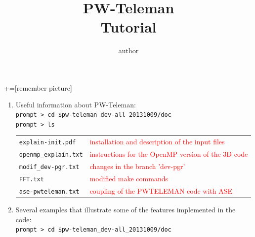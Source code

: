 \documentclass[10pt]{beamer}
\title%
{PW-Teleman\\
Tutorial }
\author[shortname]{author
 }
\institute[shortinst]{institute}
\begin{document}
+=[remember picture]

\begin{frame}
\titlepage{}
\end{frame}

\begin{frame}
\begin{enumerate}
\item Useful information about PW-Teleman:\\
\vspace*{0.2cm}
{\tt prompt > cd \$pw-teleman\_dev-all\_20131009/doc}\\
\vspace*{0.2cm}
{\tt prompt > ls}\\
\vspace*{0.4cm}

\begin{tabular}{ll}
\vspace*{0.2cm}
{\tt explain-init.pdf}& \footnotesize{\textcolor{red}{installation and description of the input files}}\\
\vspace*{0.2cm}
{\tt openmp\_explain.txt} & \footnotesize{\textcolor{red}{instructions for the OpenMP version of the 3D code}}\\
\vspace*{0.2cm}
{\tt modif\_dev-pgr.txt} &\footnotesize{\textcolor{red}{changes in the branch 'dev-pgr'}}\\
\vspace*{0.2cm}
{\tt FFT.txt} & \footnotesize{\textcolor{red}{modified make commands}}\\
\vspace*{0.2cm}
{\tt ase-pwteleman.txt} & \footnotesize{\textcolor{red}{coupling of the PWTELEMAN code with ASE}}\\
\end{tabular}
\vspace*{0.2cm}
\item Several examples that illustrate some of the features implemented in the code:\\
\vspace*{0.2cm}
{\tt prompt > cd \$pw-teleman\_dev-all\_20131009/doc}
\end{enumerate}
\end{frame}

\end{document}
